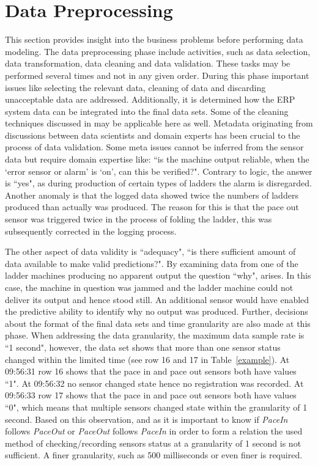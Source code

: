 \documentclass[runningheads]{llncs}
\begin{document}
\section {Data Preprocessing}
\label{sec:datapreparation}
This section provides insight into the business problems before performing data modeling. The data preprocessing phase include activities, such as data selection, data transformation, data cleaning and data validation. These tasks may be performed several times and not in any given order. During this phase important issues like selecting the relevant data, cleaning of data and discarding unacceptable data are addressed. Additionally, it is determined how the ERP system data can be integrated into the final data sets. Some of the cleaning techniques discussed in \cite{iftikhar} may be applicable here as well. Metadata originating from discussions between data scientists and domain experts has been crucial to the process of data validation. Some meta issues cannot be inferred from the sensor data but require domain expertise like: ``is the machine output reliable, when the `error sensor or alarm' is `on', can this be verified?". Contrary to logic, the answer is ``yes", as during production of certain types of ladders the alarm is disregarded. Another anomaly is that the logged data showed twice the numbers of ladders produced than actually was produced. The reason for this is that the pace out sensor was triggered twice in the process of folding the ladder, this was subsequently corrected in the logging process. 

The other aspect of data validity is ``adequacy", ``is there sufficient amount of data available to make valid predictions?". By examining data from one of the ladder machines producing no apparent output the question ``why", arises. In this case, the machine in question was jammed and the ladder machine could not deliver its output and hence stood still. An additional sensor would have enabled the predictive ability to identify why no output was produced. Further, decisions about the format of the final data sets and time granularity are also made at this phase. When addressing the data granularity, the maximum data sample rate is ``1 second", however, the data set shows that more than one sensor status changed within the limited time (see row 16 and 17 in Table~\ref{example}). At 09:56:31 row 16 shows that the pace in and pace out sensors both have values ``1". At 09:56:32 no sensor changed state hence no registration was recorded. At 09:56:33 row 17 shows that the pace in and pace out sensors both have values ``0", which means that multiple sensors changed state within the granularity of 1 second. Based on this observation, and as it is important to know if \emph{PaceIn} follows \emph{PaceOut} or \emph{PaceOut} follows \emph{PaceIn} in order to form a relation the used method of checking/recording sensors status at a granularity of 1 second is not sufficient. A finer granularity, such as 500 milliseconds or even finer is required.
\end{document}
